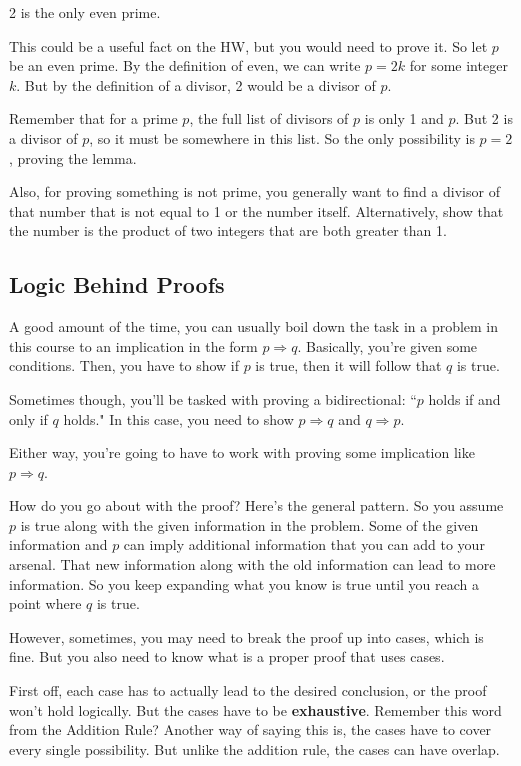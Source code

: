 \documentclass[11pt]{scrartcl}
\begin{document}
\begin{lemma}
    2 is the only even prime.
\end{lemma}
    This could be a useful fact on the HW, but you would need to prove it. So let $p$ be an even prime. By the definition of even, we can write $p = 2k$ for some integer $k$. But by the definition of a divisor, 2 would be a divisor of $p$.

    Remember that for a prime $p$, the full list of divisors of $p$ is only 1 and $p$. But 2 is a divisor of $p$, so it must be somewhere in this list. So the only possibility is $p = 2$, proving the lemma.

    Also, for proving something is not prime, you generally want to find a divisor of that number that is not equal to 1 or the number itself. Alternatively, show that the number is the product of two integers that are both greater than 1.

\subsection{Logic Behind Proofs}

A good amount of the time, you can usually boil down the task in a problem in this course to an implication in the form $p \Rightarrow q$. Basically, you're given some conditions. Then, you have to show if $p$ is true, then it will follow that $q$ is true.

Sometimes though, you'll be tasked with proving a bidirectional: ``$p$ holds if and only if $q$ holds." In this case, you need to show $p \Rightarrow q$ and $q \Rightarrow p$.

Either way, you're going to have to work with proving some implication like $p \Rightarrow q$.

How do you go about with the proof? Here's the general pattern. So you assume $p$ is true along with the given information in the problem. Some of the given information and $p$ can imply additional information that you can add to your arsenal. That new information along with the old information can lead to more information. So you keep expanding what you know is true until you reach a point where $q$ is true.

However, sometimes, you may need to break the proof up into cases, which is fine. But you also need to know what is a proper proof that uses cases.

First off, each case has to actually lead to the desired conclusion, or the proof won't hold logically. But the cases have to be \textbf{exhaustive}. Remember this word from the Addition Rule? Another way of saying this is, the cases have to cover every single possibility. But unlike the addition rule, the cases can have overlap.
\end{document}
